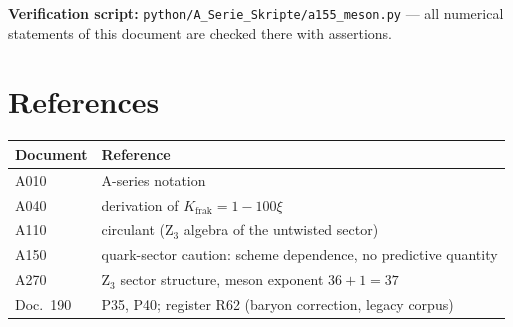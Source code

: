 \medskip\noindent\textbf{Verification script:} \texttt{python/A\_Serie\_Skripte/a155\_meson.py}
--- all numerical statements of this document are checked there with assertions.

\section{References}

\begin{center}
{\small\begin{tabular}{ll}
\toprule
Document & Reference \\
\midrule
A010 & A-series notation \\
A040 & derivation of $K_\text{frak} = 1-100\xi$ \\
A110 & circulant (Z$_3$ algebra of the untwisted sector) \\
A150 & quark-sector caution: scheme dependence, no predictive quantity \\
A270 & Z$_3$ sector structure, meson exponent $36+1=37$ \\
Doc.~190 & P35, P40; register R62 (baryon correction, legacy corpus) \\
\bottomrule
\end{tabular}}
\end{center}
